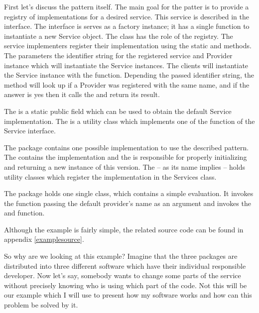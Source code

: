 First let's discuss the pattern itself. The main goal for the patter is to
provide a registry of implementations for a desired service. This service is
described in the  interface. The  interface is
serves as a factory instance; it has a single function to instantiate a new
Service object. The  class has the role of the registry.
The service implementers register their implementation using the static
 and  methods. The
parameters the identifier string for the registered service and Provider
instance which will instantiate the Service instances. The clients will
instantiate the Service instance with the  function.
Depending the passed identifier string, the method will look up if a Provider
was registered with the same name, and if the answer is yes then it calls the
 and return its result.

The  is a static public field which can be used to
obtain the default Service implementation. The  is a
utility class which implements one of the function of the Service interface.

The  package contains one possible implementation to use the
described pattern. The  contains the implementation and the
 is responsible for properly initializing and returning a
new instance of this version. The  -- as its name implies --
holds utility classes which register the implementation in the Services class.

The  package holds one single  class, which contains a
simple evaluation. It invokes the  function passing
the default provider's name as an argument and invokes the  and
 function.

Although the example is fairly simple, the related source code can be found in
appendix \autoref{examplesource}.

So why are we looking at this example? Imagine that the three packages are
distributed into three different software which have their individual
responsible developer. Now let's say, somebody wants to change some parts of the
service without precisely knowing who is using which part of the code. Not this
will be our example which I will use to present how my software works and how
can this problem be solved by it. 


